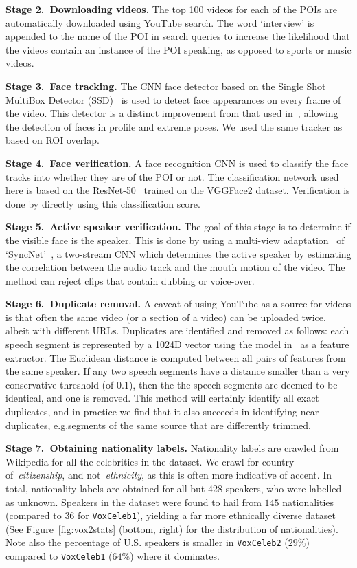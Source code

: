 \documentclass[a4paper]{article}
\def\newpara{\vspace{2pt}}
\begin{document}
\newpara\noindent\textbf{Stage 2.\  Downloading videos.}
The top 100 videos for each of the POIs are automatically downloaded using YouTube search. The word `interview' is appended to the name of the POI in search queries to increase the likelihood that the videos contain an instance of the POI speaking, as opposed to sports or music videos. 

\newpara\noindent\textbf{Stage 3.\  Face tracking.}
The CNN face detector based on the
Single Shot MultiBox Detector (SSD)~\cite{Liu16}
is used to detect face appearances
 on every frame of the video. This detector is a distinct improvement  from that used in~\cite{Nagrani17}, allowing the detection of faces in profile and extreme poses. 
 We used the same tracker as~\cite{Nagrani17} based on ROI overlap.
 
\newpara\noindent\textbf{Stage 4.\  Face verification. }
A face recognition CNN is used to classify the face tracks into whether they are of the POI or not.
The classification network used here is based on the ResNet-50~\cite{He15} trained on the VGGFace2
dataset. Verification is done by directly using this
classification score. 

\newpara\noindent\textbf{Stage 5.\  Active speaker verification.}
The goal of this stage is to determine if the  visible face is the speaker. This is done by using a multi-view adaptation~\cite{Chung17a} of `SyncNet'~\cite{Chung16a,Chung18}, a two-stream CNN which determines the active speaker by estimating the correlation between the audio track and the mouth motion of the video. The method can reject clips that contain dubbing or voice-over. 

\newpara\noindent\textbf{Stage 6.\  Duplicate removal. } 
A caveat of using YouTube as a source for videos is that often the
same video (or a section of a video) can be uploaded twice, albeit
with different URLs. Duplicates are identified and removed as follows:
each speech segment  is represented by a  1024D  vector using
the model in~\cite{Nagrani17} as a feature extractor.
The Euclidean distance is computed between all pairs of 
features from the same speaker. If any two speech segments  have a
distance smaller than a very conservative threshold (of $0.1$), then the 
the speech segments are deemed to be identical, and one is removed. This method will certainly
identify all exact duplicates, and in practice we find that it also succeeds in identifying near-duplicates,
e.g.\speech segments of the same source that are differently trimmed. 

\newpara\noindent\textbf{Stage 7.\  Obtaining nationality labels. } 
Nationality labels are crawled from Wikipedia for all the celebrities
in the dataset. We crawl for country of~\textit{citizenship}, and
not~\textit{ethnicity}, as this is often more indicative of accent. In
total,  nationality labels are obtained for all but 428 speakers, who
were labelled as unknown. Speakers in the dataset were found to hail
from $145$ nationalities (compared to $36$ for { \tt VoxCeleb1}),
yielding a far more ethnically diverse dataset (See
Figure~\ref{fig:vox2stats} (bottom, right) for the distribution of
nationalities). Note also the percentage of U.S. speakers is smaller in
{ \tt VoxCeleb2} ($29\%$) compared to { \tt VoxCeleb1} ($64\%$) where
it dominates. 
\end{document}
